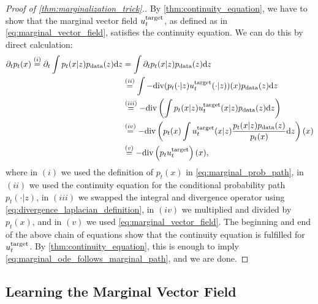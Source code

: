\begin{proof}[Proof of \cref{thm:marginalization_trick}.]
By \cref{thm:continuity_equation}, we have to show that the marginal vector field $u^{\text{target}}_t$, as defined as in \cref{eq:marginal_vector_field}, satisfies the continuity equation. We can do this by direct calculation:
\begin{align*}
\partial_t p_t(x) \overset{(i)}
{=} \partial_t\int p_t(x|z) p_{\rm{data}} (z) \mathrm{d} z
&= \int \partial_t p_t(x|z) p_{\rm{data}} (z) \mathrm{d} z\\
&\overset{(ii)}{=} \int -\mathrm{div} (p_t(\cdot|z)u^{\text{target}}_t(\cdot|z))(x) p_{\rm{data}} (z) \mathrm{d} z\\
&\overset{(iii)}{=} -\mathrm{div} \left(\int p_t(x|z) u^{\text{target}}_t(x|z)p_{\rm{data}}(z) \mathrm{d} z\right)\\
&\overset{(iv)}{=} -\mathrm{div} \left(p_t(x)\int u^{\text{target}}_t(x|z) \frac{p_t(x|z)p_{\rm{data}}(z)}{p_t(x)}\mathrm{d} z\right)(x)\\
&\overset{(v)}{=} -\mathrm{div} \left(p_tu^{\text{target}}_t\right)(x),
\end{align*}
where in $(i)$ we used the definition of $p_t(x)$ in \cref{eq:marginal_prob_path}, in $(ii)$ we used the continuity equation for the conditional probability path $p_t(\cdot|z)$, in $(iii)$ we swapped the integral and divergence operator using \cref{eq:divergence_laplacian_definition}, in $(iv)$ we multiplied and divided by $p_t(x)$, and in $(v)$ we used \cref{eq:marginal_vector_field}. The beginning and end of the above chain of equations show that the continuity equation is fulfilled for $u^{\text{target}}_t$. By \cref{thm:continuity_equation}, this is enough to imply \cref{eq:marginal_ode_follows_marginal_path}, and we are done.
\end{proof}


\subsection{Learning the Marginal Vector Field}

